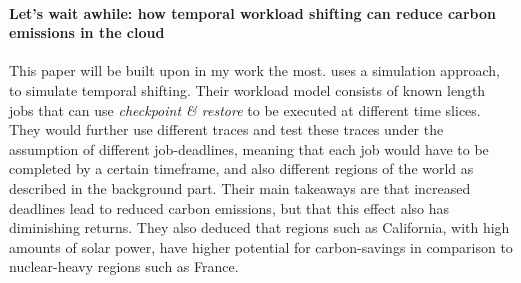 \paragraph{Let's wait awhile: how temporal workload shifting can reduce carbon emissions in the cloud} This paper will be built upon in my work the most.
\cite{wiesner_lets_2021} uses a simulation approach, to simulate temporal shifting. Their workload model consists of known length jobs that can use \emph{checkpoint \& restore} to be executed at different time slices. 
They would further use different traces and test these traces under the assumption of different job-deadlines, meaning that each job would have to be completed by a certain timeframe, and also different regions of the world as described in the background part. 
Their main takeaways are that increased deadlines lead to reduced carbon emissions, but that this effect also has diminishing returns. 
They also deduced that regions such as California, with high amounts of solar power, have higher potential for carbon-savings in comparison to nuclear-heavy regions such as France.